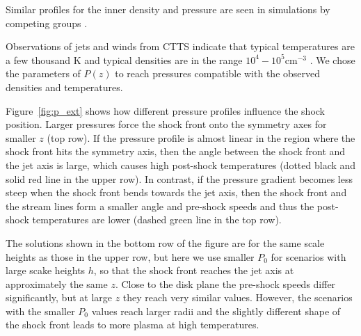 Similar profiles for the inner density and pressure are seen in simulations by competing groups \citep[e.g.]{2005ApJ...630..945A,Li_Krasnopolsky_Blandford_2006,2008ApJ...678.1109M}.

Observations of jets and winds from CTTS indicate that typical temperatures are a few thousand K and typical densities are in the range $10^4-10^5 \mathrm{ cm}^{-3}$ \citep[e.g.][]{2000A&A...356L..41L,2007ApJ...657..897K}. We chose the parameters of $P(z)$ to reach pressures compatible with the observed densities and temperatures.

Figure~\ref{fig:p_ext} shows how different pressure profiles influence the shock position. 
Larger pressures force the shock front onto the symmetry axes for smaller $z$ (top row). If the pressure profile is almost linear in the region where the shock front hits the symmetry axis, then the angle between the shock front and the jet axis is large, which causes high post-shock temperatures (dotted black and solid red line in the upper row). In contrast, if the pressure gradient becomes less steep when the shock front bends towards the jet axis, then the shock front and the stream lines form a smaller angle and pre-shock speeds and thus the post-shock temperatures are lower (dashed green line in the top row).

The solutions shown in the bottom row of the figure are for the same scale heights as those in the upper row, but here we use smaller $P_0$ for scenarios with large scake heights $h$, so that the shock front reaches the jet axis at approximately the same $z$. Close to the disk plane the pre-shock speeds differ significantly, but at large $z$ they reach very similar values. However, the scenarios with the smaller $P_0$ values reach larger radii and the slightly different shape of the shock front leads to more plasma at high temperatures.